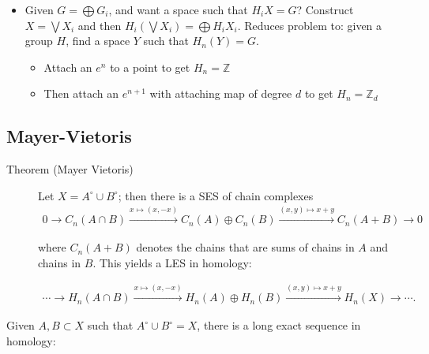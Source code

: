 \begin{itemize}
\tightlist
\item
  Given \(G = \bigoplus G_i\), and want a space such that \(H_i X = G\)?
  Construct \(X = \bigvee X_i\) and then
  \(H_i (\bigvee X_i) = \bigoplus H_i X_i\). Reduces problem to: given a
  group \(H\), find a space \(Y\) such that \(H_n(Y) = G\).

  \begin{itemize}
  \tightlist
  \item
    Attach an \(e^n\) to a point to get \(H_n = {\mathbb{Z}}\)
  \item
    Then attach an \(e^{n+1}\) with attaching map of degree \(d\) to get
    \(H_n = {\mathbb{Z}}_d\)
  \end{itemize}
\end{itemize}

\hypertarget{mayer-vietoris}{%
\subsection{Mayer-Vietoris}\label{mayer-vietoris}}

\begin{description}
\item[Theorem (Mayer Vietoris)]
Let \(X = A^\circ \cup B^\circ\); then there is a SES of chain complexes
\begin{align*} 0 \to C_n(A\cap B) \xrightarrow{x\mapsto (x, -x)} C_n(A) \oplus C_n(B) \xrightarrow{(x, y) \mapsto x+y} C_n(A + B) \to 0 \end{align*}

where \(C_n(A+B)\) denotes the chains that are sums of chains in \(A\)
and chains in \(B\). This yields a LES in homology:

\begin{align*} \cdots \to H_n(A\cap B) \xrightarrow{x\mapsto (x, -x)} H_n(A) \oplus H_n(B) \xrightarrow{(x, y) \mapsto x+y} H_n(X) \to \cdots .\end{align*}
\end{description}

Given \(A,B \subset X\) such that \(A^\circ \cup B^\circ = X\), there is
a long exact sequence in homology:

